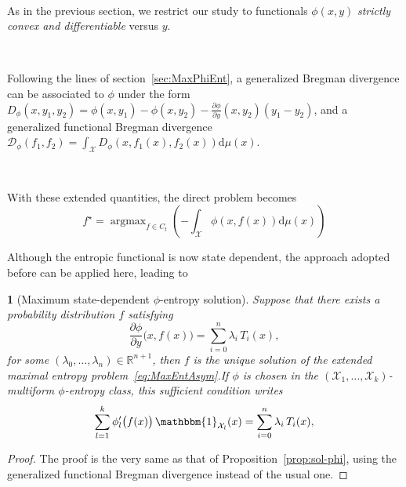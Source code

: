 \documentclass[english,sort&compress]{elsarticle}
\theoremstyle{definition}
\theoremstyle{plain}
\newtheorem{prop}{\protect\propositionname}
\theoremstyle{plain}
\providecommand{\propositionname}{Proposition}
\def\dmu{\mathrm{d}\mu}
\def\fD{\mathcal{D}}
\def\Rset{\mathbb{R}}
\def\X{\mathcal{X}}
\def\un{\mathbbm{1}}
\DeclareMathOperator*{\argmax}{\operatorname{argmax}}
\begin{document}
\

As in  the previous  section, we restrict  our study to  functionals $\phi(x,y)$
{\em strictly convex and differentiable} versus $y$.

\

Following  the  lines  of  section~\ref{sec:MaxPhiEnt},  a  generalized  Bregman
divergence  can be  associated to  $\phi$  under the  form $D_\phi(x,y_1,y_2)  =
\phi(x,y_1) - \phi(x,y_2) - \frac{\partial \phi}{\partial y}(x,y_2) \left( y_1 -
  y_2 \right)$,  and a generalized functional  Bregman divergence $\displaystyle
\fD_\phi(f_1,f_2) = \int_\X D_\phi(x,f_1(x),f_2(x)) \dmu(x)$.

\

With these extended quantities, the direct problem becomes
%
\begin{equation}\label{eq:MaxEntAsym}
f^\star = \argmax_{f \in C_t} \left( - \int_\X \phi(x,f(x)) \dmu(x) \right)
\end{equation}

Although the  entropic functional is  now state dependent, the  approach adopted
before can be applied here, leading to

\begin{prop}[Maximum                state-dependent               $\phi$-entropy
  solution]\label{prop:sol-asym_phi}
%
  Suppose that there exists a probability distribution $f$ satisfying
  \begin{equation}\label{eq:sol-asym_phi}
  \frac{\partial \phi}{\partial y}\big(x,f(x)\big) = \sum_{i=0}^n \lambda_i \,
T_i(x),
  \end{equation}
  for  some  $(\lambda_0,\ldots,\lambda_n) \in  \Rset^{n+1}$,  then  $f$ is  the
  unique      solution      of       the      extended      maximal      entropy
  problem~\eqref{eq:MaxEntAsym}.\newline  If $\phi$  is chosen  in the  $(\X_1 ,
  \ldots  ,  \X_k)$-multiform $\phi$-entropy  class,  this sufficient  condition
  writes
  \begin{equation}\label{eq:sol-multiform_phi}
  \sum_{l=1}^k \phi_l'\big(f(x)\big) \, \un_{\X_l}(x) =
  \sum_{i=0}^n \lambda_i \, T_i(x),
  \end{equation}
\end{prop}
%
\begin{proof}
  The proof  is the very  same as that of  Proposition~\ref{prop:sol-phi}, using
  the generalized functional Bregman divergence instead of the usual one.
\end{proof}
\end{document}
